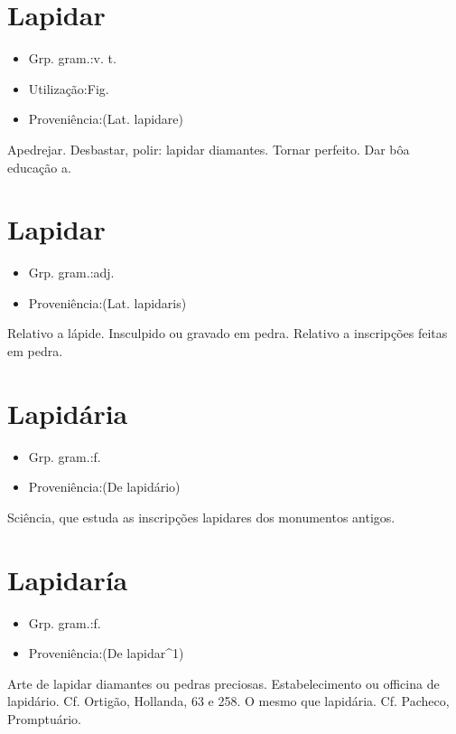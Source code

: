 \section{Lapidar}
\begin{itemize}
\item {Grp. gram.:v. t.}
\end{itemize}
\begin{itemize}
\item {Utilização:Fig.}
\end{itemize}
\begin{itemize}
\item {Proveniência:(Lat. \textunderscore lapidare\textunderscore )}
\end{itemize}
Apedrejar.
Desbastar, polir: \textunderscore lapidar diamantes\textunderscore .
Tornar perfeito.
Dar bôa educação a.
\section{Lapidar}
\begin{itemize}
\item {Grp. gram.:adj.}
\end{itemize}
\begin{itemize}
\item {Proveniência:(Lat. \textunderscore lapidaris\textunderscore )}
\end{itemize}
Relativo a lápide.
Insculpido ou gravado em pedra.
Relativo a inscripções feitas em pedra.
\section{Lapidária}
\begin{itemize}
\item {Grp. gram.:f.}
\end{itemize}
\begin{itemize}
\item {Proveniência:(De \textunderscore lapidário\textunderscore )}
\end{itemize}
Sciência, que estuda as inscripções lapidares dos monumentos antigos.
\section{Lapidaría}
\begin{itemize}
\item {Grp. gram.:f.}
\end{itemize}
\begin{itemize}
\item {Proveniência:(De \textunderscore lapidar\textunderscore ^1)}
\end{itemize}
Arte de lapidar diamantes ou pedras preciosas.
Estabelecimento ou officina de lapidário. Cf. Ortigão, \textunderscore Hollanda\textunderscore , 63 e 258.
O mesmo que \textunderscore lapidária\textunderscore . Cf. Pacheco, \textunderscore Promptuário\textunderscore .
